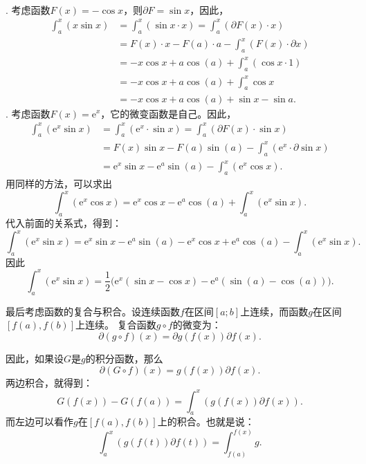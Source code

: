 \documentclass[12pt,UTF8]{ctexbook}
\begin{document}
\begin{so}    
    \mbox{} \\
    . 考虑函数$F(x) = -\cos{x}$，则$\partial F = \sin{x}$，因此，
    \begin{align*}
        \int_a^x (x\sin{x}) &= \int_a^x (\sin{x}\cdot x) = \int_a^x (\partial F(x) \cdot x) \\
        &= F(x)\cdot x - F(a)\cdot a - \int_a^x (F(x) \cdot \partial x) \\
        &= -x\cos{x} + a\cos(a) + \int_a^x (\cos{x} \cdot 1) \\
        &= -x\cos{x} + a\cos(a) + \int_a^x \cos{x} \\
        &= -x\cos{x} + a\cos(a) + \sin{x} - \sin{a}.
    \end{align*}
    . 考虑函数$F(x) = \mathrm{e}^x$，它的微变函数是自己。因此，
    \begin{align*}
        \int_a^x \left(\mathrm{e}^{x} \sin{x}\right) &= \int_a^x \left(\mathrm{e}^x\cdot \sin{x}\right) = \int_a^x \left(\partial F(x) \cdot \sin{x}\right) \\
        &= F(x)\sin{x} - F(a)\sin(a) - \int_a^x \left(\mathrm{e}^{x} \cdot \partial \sin{x}\right) \\
        &= \mathrm{e}^x\sin{x} - \mathrm{e}^a\sin(a) - \int_a^x \left(\mathrm{e}^x \cos{x}\right) .
    \end{align*}
    用同样的方法，可以求出
    $$  \int_a^x \left(\mathrm{e}^x \cos{x}\right) = \mathrm{e}^x\cos{x} - \mathrm{e}^a\cos(a) + \int_a^x \left(\mathrm{e}^{x} \sin{x}\right). $$
    代入前面的关系式，得到：
    $$ \int_a^x \left(\mathrm{e}^{x} \sin{x}\right) = \mathrm{e}^x\sin{x} - \mathrm{e}^a\sin(a) - \mathrm{e}^x\cos{x} + \mathrm{e}^a\cos(a) - \int_a^x \left(\mathrm{e}^{x} \sin{x}\right). $$
    因此
    $$ \int_a^x \left(\mathrm{e}^{x} \sin{x}\right) = \frac{1}{2}\big(\mathrm{e}^x(\sin{x} - \cos{x}) - \mathrm{e}^a(\sin(a) - \cos(a))\big).$$
\end{so}

最后考虑函数的复合与积合。设连续函数$f$在区间$[a; b]$上连续，而函数$g$在区间$[f(a), f(b)]$上连续。
复合函数$g\circ f$的微变为：
$$ \partial (g \circ f) (x) = \partial g(f(x)) \partial f (x). $$

因此，如果设$G$是$g$的积分函数，那么
$$ \partial (G \circ f) (x) = g(f(x)) \partial f (x). $$
两边积合，就得到：
$$ G(f(x)) - G(f(a)) = \int_a^x \left( g(f(x)) \partial f (x) \right).$$
而左边可以看作$g$在$[f(a), f(b)]$上的积合。也就是说：
$$ \int_a^x \left( g(f(t)) \partial f (t) \right) = \int_{f(a)}^{f(x)} g.$$
\end{document}
